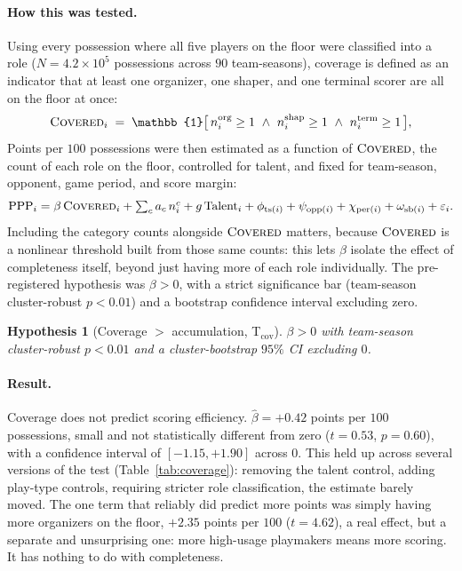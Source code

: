 \documentclass[11pt]{article}
\newcommand{\PPP}{\text{PPP}}
\newtheorem{hypothesis}{Hypothesis}
\begin{document}
\paragraph{How this was tested.}
Using every possession where all five players on the floor were classified into a role
($N=4.2\times10^{5}$ possessions across $90$ team-seasons), coverage is defined as an
indicator that at least one organizer, one shaper, and one terminal scorer are all on the
floor at once:
\begin{equation}
\label{eq:covered}
\textsc{Covered}_i \;=\; \mathbb{1}\big[\,n^{\text{org}}_i\ge 1 \ \wedge\
n^{\text{shap}}_i\ge 1 \ \wedge\ n^{\text{term}}_i\ge 1\,\big],
\end{equation}
Points per $100$ possessions were then estimated as a function of $\textsc{Covered}$, the
count of each role on the floor, controlled for talent, and fixed for team-season,
opponent, game period, and score margin:
\begin{equation}
\label{eq:coverage}
\PPP_i = \beta\,\textsc{Covered}_i
 + \textstyle\sum_{c} a_c\, n^{c}_i
 + g\,\text{Talent}_i
 + \phi_{\text{ts}(i)} + \psi_{\text{opp}(i)} + \chi_{\text{per}(i)} + \omega_{\text{sb}(i)}
 + \varepsilon_i .
\end{equation}
Including the category counts alongside $\textsc{Covered}$ matters, because
$\textsc{Covered}$ is a nonlinear threshold built from those same counts: this lets $\beta$
isolate the effect of completeness itself, beyond just having more of each role
individually. The pre-registered hypothesis was $\beta>0$, with a strict significance bar
(team-season cluster-robust $p<0.01$) and a bootstrap confidence interval excluding zero.
\begin{hypothesis}[Coverage $>$ accumulation, T$_{\text{cov}}$]
\label{hyp:cov}
$\beta>0$ with team-season cluster-robust $p<0.01$ and a cluster-bootstrap $95\%$ CI excluding
$0$.
\end{hypothesis}

\paragraph{Result.}
Coverage does not predict scoring efficiency.
$\hat\beta=+0.42$ points per $100$ possessions, small and not statistically different from
zero ($t=0.53$, $p=0.60$), with a confidence interval of $[-1.15,+1.90]$ across $0$. This
held up across several versions of the test (Table~\ref{tab:coverage}): removing the talent
control, adding play-type controls, requiring stricter role classification, the estimate
barely moved. The one term that reliably did predict more points was simply having more
organizers on the floor, $+2.35$ points per $100$ ($t=4.62$), a real effect, but a separate
and unsurprising one: more high-usage playmakers means more scoring. It has nothing to do
with completeness.
\end{document}

